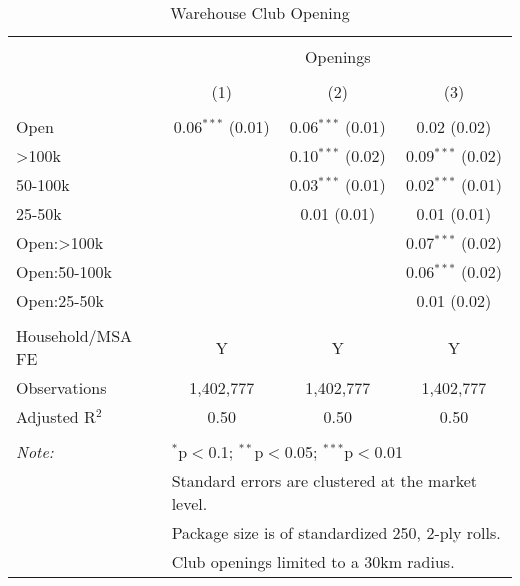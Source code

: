 
\begin{table}[!htbp] \centering 
  \caption{Warehouse Club Opening} 
  \label{tab:clubOpening} 
\begin{tabular}{@{\extracolsep{5pt}}lccc} 
\\[-1.8ex]\hline 
\hline \\[-1.8ex] 
 & \multicolumn{3}{c}{Openings} \\ 
\\[-1.8ex] & (1) & (2) & (3)\\ 
\hline \\[-1.8ex] 
 Open & 0.06$^{***}$ (0.01) & 0.06$^{***}$ (0.01) & 0.02 (0.02) \\ 
  >100k &  & 0.10$^{***}$ (0.02) & 0.09$^{***}$ (0.02) \\ 
  50-100k &  & 0.03$^{***}$ (0.01) & 0.02$^{***}$ (0.01) \\ 
  25-50k &  & 0.01 (0.01) & 0.01 (0.01) \\ 
  Open:>100k &  &  & 0.07$^{***}$ (0.02) \\ 
  Open:50-100k &  &  & 0.06$^{***}$ (0.02) \\ 
  Open:25-50k &  &  & 0.01 (0.02) \\ 
 \hline \\[-1.8ex] 
Household/MSA FE & Y & Y & Y \\ 
Observations & 1,402,777 & 1,402,777 & 1,402,777 \\ 
Adjusted R$^{2}$ & 0.50 & 0.50 & 0.50 \\ 
\hline 
\hline \\[-1.8ex] 
\textit{Note:}  & \multicolumn{3}{l}{$^{*}$p$<$0.1; $^{**}$p$<$0.05; $^{***}$p$<$0.01} \\ 
 & \multicolumn{3}{l}{Standard errors are clustered at the market level.} \\ 
 & \multicolumn{3}{l}{Package size is of standardized 250, 2-ply rolls.} \\ 
 & \multicolumn{3}{l}{Club openings limited to a 30km radius.} \\ 
\end{tabular} 
\end{table} 
